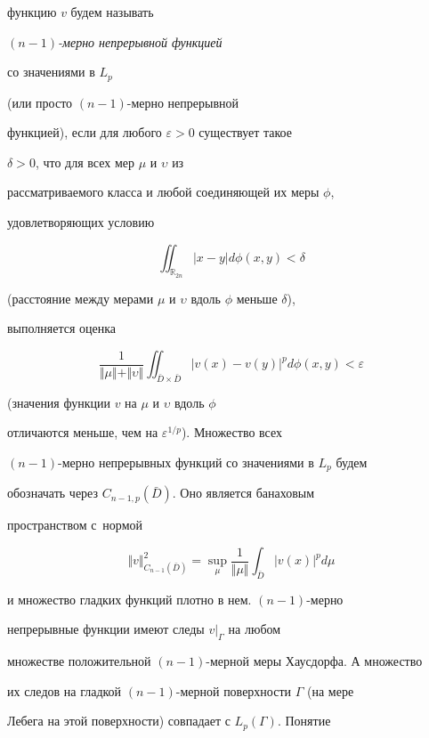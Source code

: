 функцию $v$ будем называть {\it $(n-1)$-мерно непрерывной функцией

со значениями в $L_p$} (или просто $(n-1)$-мерно непрерывной

функцией), если для любого $\varepsilon > 0$ существует такое

$\delta >0$, что для всех  мер $ \mu$ и $\upsilon$ из

рассматриваемого класса и любой соединяющей их меры $\phi$,

удовлетворяющих условию

$$

\iint _{{\mathbb{R}}_{2n}} |x - y| d\phi (x, y) < \delta

$$

(расстояние между мерами $\mu$ и $\upsilon$ вдоль $\phi$ меньше $\delta$),

выполняется оценка

$$

\frac{1}{\Vert\mu\Vert + \Vert\upsilon\Vert} \iint _{\bar{D}

\times \bar{D}} |v(x) - v(y)|^p d\phi (x, y) < \varepsilon

$$

(значения функции $v$ на $\mu$ и $\upsilon$ вдоль $\phi$

отличаются меньше, чем на ${\varepsilon}^{1/p}$). Множество всех

$(n-1)$-мерно непрерывных функций со значениями в $L_p$ будем

обозначать через $C_{n-1, p}(\bar{D})$. Оно является банаховым

пространством с~нормой

\begin{equation}

\label{gushin:eq4.2} \Vert v\Vert^2_{C_{n-1}(\bar{D})} =

\sup\limits_{\mu} \frac{1}{\Vert\mu\Vert } \int _{\bar{D}}

|v(x)|^p d\mu

\end{equation}

и множество гладких функций плотно в нем. $(n-1)$-мерно

непрерывные  функции имеют следы $v|_{\Gamma}$ на любом

множестве положительной $(n-1)$-мерной меры Хаусдорфа. А множество

их следов на гладкой $(n-1)$-мерной поверхности $\Gamma$ (на мере

Лебега на этой поверхности) совпадает с $L_p(\Gamma)$. Понятие

